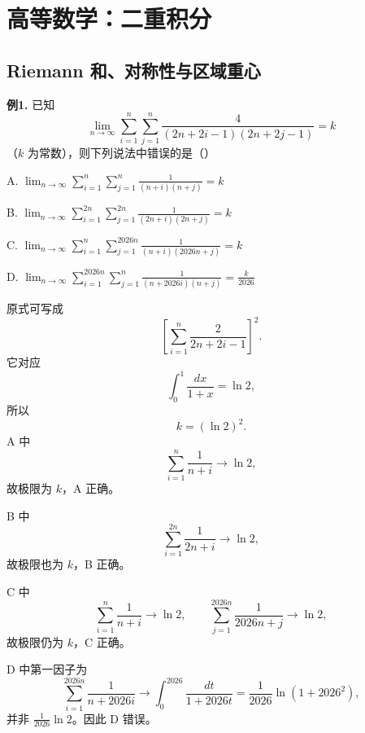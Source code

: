 \chapter{高等数学：二重积分}

\section{Riemann 和、对称性与区域重心}

\begin{problemblock}
\textbf{例1.} 已知
\[
\lim_{n\to\infty}\sum_{i=1}^n\sum_{j=1}^n
\frac{4}{(2n+2i-1)(2n+2j-1)}=k
\]
（\(k\) 为常数），则下列说法中错误的是（\quad）

A. \(\displaystyle \lim_{n\to\infty}\sum_{i=1}^n\sum_{j=1}^n
\frac1{(n+i)(n+j)}=k\)

B. \(\displaystyle \lim_{n\to\infty}\sum_{i=1}^{2n}\sum_{j=1}^{2n}
\frac1{(2n+i)(2n+j)}=k\)

C. \(\displaystyle \lim_{n\to\infty}\sum_{i=1}^n\sum_{j=1}^{2026n}
\frac1{(n+i)(2026n+j)}=k\)

D. \(\displaystyle \lim_{n\to\infty}\sum_{i=1}^{2026n}\sum_{j=1}^n
\frac1{(n+2026i)(n+j)}=\frac{k}{2026}\)
\end{problemblock}
\begin{solutionblock}
原式可写成
\[
\left[\sum_{i=1}^n\frac{2}{2n+2i-1}\right]^2.
\]
它对应
\[
\int_0^1\frac{dx}{1+x}=\ln2,
\]
所以
\[
k=(\ln2)^2.
\]
A 中
\[
\sum_{i=1}^n\frac1{n+i}\to\ln2,
\]
故极限为 \(k\)，A 正确。

B 中
\[
\sum_{i=1}^{2n}\frac1{2n+i}\to\ln2,
\]
故极限也为 \(k\)，B 正确。

C 中
\[
\sum_{i=1}^n\frac1{n+i}\to\ln2,\qquad
\sum_{j=1}^{2026n}\frac1{2026n+j}\to\ln2,
\]
故极限仍为 \(k\)，C 正确。

D 中第一因子为
\[
\sum_{i=1}^{2026n}\frac1{n+2026i}
\to
\int_0^{2026}\frac{dt}{1+2026t}
=\frac1{2026}\ln(1+2026^2),
\]
并非 \(\frac1{2026}\ln2\)。因此 D 错误。
\end{solutionblock}

